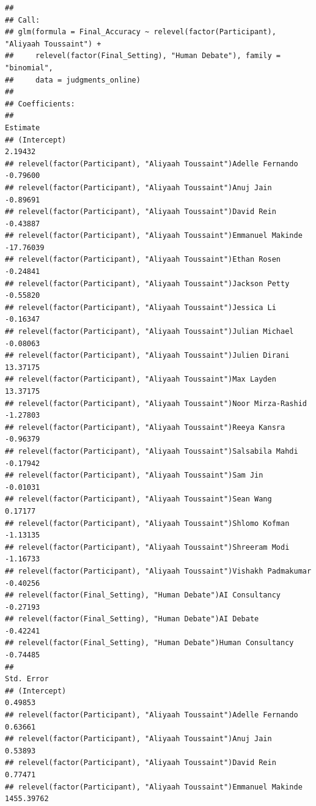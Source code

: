 \documentclass[
]{article}
\begin{document}
\begin{verbatim}
## 
## Call:
## glm(formula = Final_Accuracy ~ relevel(factor(Participant), "Aliyaah Toussaint") + 
##     relevel(factor(Final_Setting), "Human Debate"), family = "binomial", 
##     data = judgments_online)
## 
## Coefficients:
##                                                                       Estimate
## (Intercept)                                                            2.19432
## relevel(factor(Participant), "Aliyaah Toussaint")Adelle Fernando      -0.79600
## relevel(factor(Participant), "Aliyaah Toussaint")Anuj Jain            -0.89691
## relevel(factor(Participant), "Aliyaah Toussaint")David Rein           -0.43887
## relevel(factor(Participant), "Aliyaah Toussaint")Emmanuel Makinde    -17.76039
## relevel(factor(Participant), "Aliyaah Toussaint")Ethan Rosen          -0.24841
## relevel(factor(Participant), "Aliyaah Toussaint")Jackson Petty        -0.55820
## relevel(factor(Participant), "Aliyaah Toussaint")Jessica Li           -0.16347
## relevel(factor(Participant), "Aliyaah Toussaint")Julian Michael       -0.08063
## relevel(factor(Participant), "Aliyaah Toussaint")Julien Dirani        13.37175
## relevel(factor(Participant), "Aliyaah Toussaint")Max Layden           13.37175
## relevel(factor(Participant), "Aliyaah Toussaint")Noor Mirza-Rashid    -1.27803
## relevel(factor(Participant), "Aliyaah Toussaint")Reeya Kansra         -0.96379
## relevel(factor(Participant), "Aliyaah Toussaint")Salsabila Mahdi      -0.17942
## relevel(factor(Participant), "Aliyaah Toussaint")Sam Jin              -0.01031
## relevel(factor(Participant), "Aliyaah Toussaint")Sean Wang             0.17177
## relevel(factor(Participant), "Aliyaah Toussaint")Shlomo Kofman        -1.13135
## relevel(factor(Participant), "Aliyaah Toussaint")Shreeram Modi        -1.16733
## relevel(factor(Participant), "Aliyaah Toussaint")Vishakh Padmakumar   -0.40256
## relevel(factor(Final_Setting), "Human Debate")AI Consultancy          -0.27193
## relevel(factor(Final_Setting), "Human Debate")AI Debate               -0.42241
## relevel(factor(Final_Setting), "Human Debate")Human Consultancy       -0.74485
##                                                                     Std. Error
## (Intercept)                                                            0.49853
## relevel(factor(Participant), "Aliyaah Toussaint")Adelle Fernando       0.63661
## relevel(factor(Participant), "Aliyaah Toussaint")Anuj Jain             0.53893
## relevel(factor(Participant), "Aliyaah Toussaint")David Rein            0.77471
## relevel(factor(Participant), "Aliyaah Toussaint")Emmanuel Makinde   1455.39762

\end{verbatim}
\end{document}
